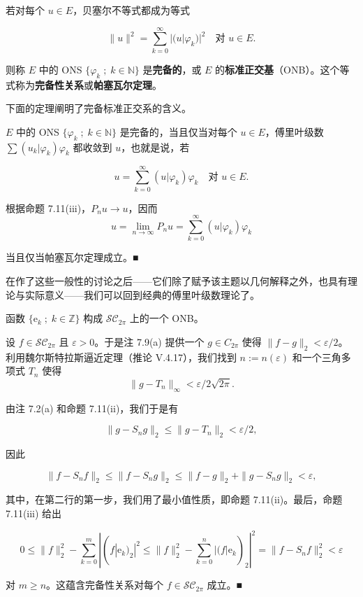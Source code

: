 若对每个 $ u \in E $，贝塞尔不等式都成为等式

\begin{equation}
\|u\|^{2} = \sum_{k=0}^{\infty}|(u|\varphi_{k})|^{2} \quad \text{对 } u \in E .\tag{7.15}
\end{equation}

则称 $ E $ 中的 ONS $ \{ \varphi_{k} \;;\; k \in \mathbb{N} \} $ 是\textbf{完备的}，或 $ E $ 的\textbf{标准正交基}（ONB）。这个等式称为\textbf{完备性关系}或\textbf{帕塞瓦尔定理}。

下面的定理阐明了完备标准正交系的含义。

\begin{theorem}

$ E $ 中的 ONS $ \{ \varphi_{k} \;;\; k \in \mathbb{N} \} $ 是完备的，当且仅当对每个 $ u \in E $，傅里叶级数 $ \sum (u_{k}|\varphi_{k})\varphi_{k} $ 都收敛到 $ u $，也就是说，若

\[
u = \sum_{k=0}^{\infty}(u|\varphi_{k})\varphi_{k} \quad \text{对 } u \in E .
\]

\proofhead
根据命题 7.11(iii)，$ P_{n}u \to u $，因而
\[
u = \lim_{n \to \infty} P_{n}u = \sum_{k=0}^{\infty}(u|\varphi_{k})\varphi_{k}
\]

当且仅当帕塞瓦尔定理成立。\nobreak\hspace{0.35em}■

\end{theorem}

在作了这些一般性的讨论之后——它们除了赋予该主题以几何解释之外，也具有理论与实际意义——我们可以回到经典的傅里叶级数理论了。

\begin{theorem}

函数 $ \{ \mathrm{e}_{k} \;;\; k \in \mathbb{Z} \} $ 构成 $ \mathcal{SC}_{2\pi} $ 上的一个 ONB。

\proofhead
设 $ f \in \mathcal{SC}_{2\pi} $ 且 $ \varepsilon > 0 $。于是注 7.9(a) 提供一个 $ g \in C_{2\pi} $ 使得 $ \|f - g\|_{2} < \varepsilon/2 $。利用魏尔斯特拉斯逼近定理（推论 V.4.17），我们找到 $ n := n(\varepsilon) $ 和一个三角多项式 $ T_{n} $ 使得
\[
\|g - T_{n}\|_{\infty} < \varepsilon/2\sqrt{2\pi} .
\]

由注 7.2(a) 和命题 7.11(ii)，我们于是有

\[
\|g - S_{n}g\|_{2} \le \|g - T_{n}\|_{2} < \varepsilon/2 ,
\]

因此

\[
\|f - S_{n}f\|_{2} \le \|f - S_{n}g\|_{2} \le \|f - g\|_{2} + \|g - S_{n}g\|_{2} < \varepsilon ,
\]

其中，在第二行的第一步，我们用了最小值性质，即命题 7.11(ii)。最后，命题 7.11(iii) 给出

\[
0 \le \|f\|_{2}^{2} - \sum_{k=0}^{m}|(f|\mathrm{e}_{k})_{2}|^{2} \le \|f\|_{2}^{2} - \sum_{k=0}^{n}|(f|\mathrm{e}_{k})_{2}|^{2} = \|f - S_{n}f\|_{2}^{2} < \varepsilon
\]

对 $ m \ge n $。这蕴含完备性关系对每个 $ f \in \mathcal{SC}_{2\pi} $ 成立。\nobreak\hspace{0.35em}■

\end{theorem}

